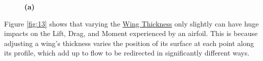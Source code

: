 \documentclass{article}
\begin{document}
\begin{figure}
  \centering
  \caption{ \textbf{(a)} }
  \label{run5}
\end{figure}

Figure \ref{fig:13} shows that varying the \hyperlink{Th}{Wing Thickness} only slightly can have huge impacts on the Lift, Drag, and Moment experienced by an airfoil. This is because adjusting a wing's thickness varies the position of its surface at each point along its profile, which add up to flow to be redirected in significantly different ways.
\end{document}
